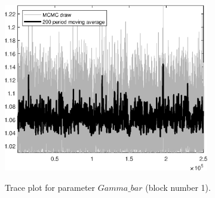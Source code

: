 \begin{figure}[H]
\centering
  \includegraphics[width=0.8\textwidth]{two_sector_RBC_fixed_cost/graphs/TracePlot_Gamma_bar_blck_1}\\
    \caption{Trace plot for parameter $Gamma\_bar$ (block number 1).}
\end{figure}
